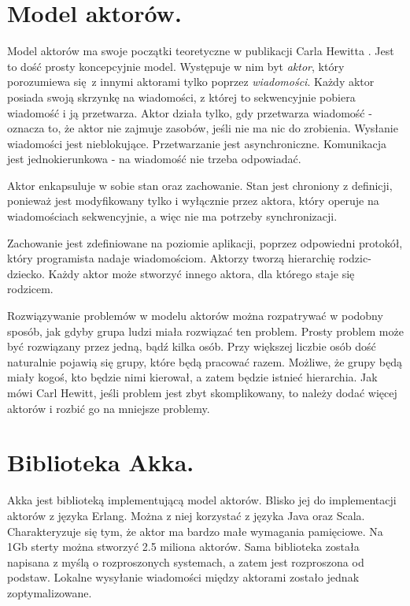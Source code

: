 \documentclass[oneside, 11pt, a4paper]{article}
\begin{document}
\begin{multicols}{2}
\section{Model aktorów.}
Model aktorów ma swoje początki teoretyczne w publikacji Carla Hewitta \cite{Hewitt:1973vp}. Jest to dość prosty koncepcyjnie model. Występuje w nim byt \emph{aktor}, który porozumiewa się z innymi aktorami tylko poprzez \emph{wiadomości}. Każdy aktor posiada swoją skrzynkę na wiadomości, z której to sekwencyjnie pobiera wiadomość i ją przetwarza. Aktor działa tylko, gdy przetwarza wiadomość - oznacza to, że aktor nie zajmuje zasobów, jeśli nie ma nic do zrobienia. Wysłanie wiadomości jest nieblokujące. Przetwarzanie jest asynchroniczne. Komunikacja jest jednokierunkowa - na wiadomość nie trzeba odpowiadać.

Aktor enkapsuluje w sobie stan oraz zachowanie. Stan jest chroniony z definicji, ponieważ jest modyfikowany tylko i wyłącznie przez aktora, który operuje na wiadomościach sekwencyjnie, a więc nie ma potrzeby synchronizacji.

Zachowanie jest zdefiniowane na poziomie aplikacji, poprzez odpowiedni protokół, który programista nadaje wiadomościom. Aktorzy tworzą hierarchię rodzic-dziecko. Każdy aktor może stworzyć innego aktora, dla którego staje się rodzicem. 

Rozwiązywanie problemów w modelu aktorów można rozpatrywać w podobny sposób, jak gdyby grupa ludzi miała rozwiązać ten problem. Prosty problem może być rozwiązany przez jedną, bądź kilka osób. Przy większej liczbie osób dość naturalnie pojawią się grupy, które będą pracować razem. Możliwe, że grupy będą miały kogoś, kto będzie nimi kierował, a zatem będzie istnieć hierarchia. Jak mówi Carl Hewitt, jeśli problem jest zbyt skomplikowany, to należy dodać więcej aktorów i rozbić go na mniejsze problemy.

\section{Biblioteka Akka.}
Akka jest biblioteką implementującą model aktorów. Blisko jej do implementacji aktorów z języka Erlang. Można z niej korzystać z języka Java oraz Scala. Charakteryzuje się tym, że aktor ma bardzo małe wymagania pamięciowe. Na 1Gb sterty można stworzyć 2.5 miliona aktorów. Sama biblioteka została napisana z myślą o rozproszonych systemach, a zatem jest rozproszona od podstaw. Lokalne wysyłanie wiadomości między aktorami zostało jednak zoptymalizowane. 


\end{multicols}
\end{document}
